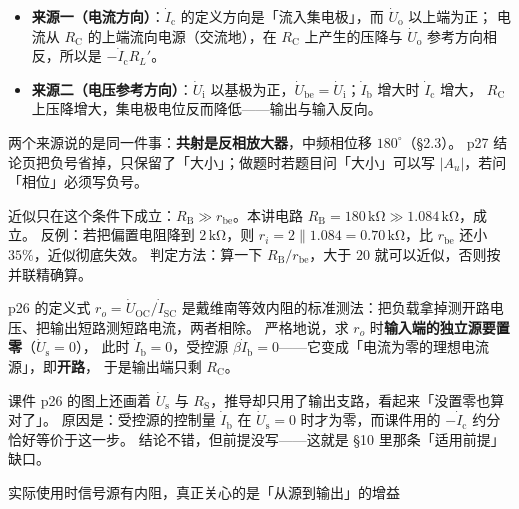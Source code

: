 \documentclass[11pt]{ctexart}
\begin{document}
\begin{itemize}
\item \textbf{来源一（电流方向）}：$\dot{I}_{\mathrm{c}}$ 的定义方向是「流入集电极」，而 $\dot{U}_{\mathrm{o}}$ 以上端为正；
电流从 $R_{\mathrm{C}}$ 的上端流向电源（交流地），在 $R_{\mathrm{C}}$ 上产生的压降与 $\dot{U}_{\mathrm{o}}$ 参考方向相反，所以是 $-\dot{I}_{\mathrm{c}}R_L'$。
\item \textbf{来源二（电压参考方向）}：$\dot{U}_{\mathrm{i}}$ 以基极为正，$\dot{U}_{\mathrm{be}}=\dot{U}_{\mathrm{i}}$；$\dot{I}_{\mathrm{b}}$ 增大时 $\dot{I}_{\mathrm{c}}$ 增大，
$R_{\mathrm{C}}$ 上压降增大，集电极电位反而降低——输出与输入反向。
\end{itemize}

两个来源说的是同一件事：\textbf{共射是反相放大器}，中频相位移 $180^\circ$（§2.3）。
p27 结论页把负号省掉，只保留了「大小」；做题时若题目问「大小」可以写 $|A_u|$，若问「相位」必须写负号。


近似只在这个条件下成立：$R_{\mathrm{B}}\gg r_{\mathrm{be}}$。本讲电路 $R_{\mathrm{B}}=180\,\mathrm{k\Omega}\gg1.084\,\mathrm{k\Omega}$，成立。
反例：若把偏置电阻降到 $2\,\mathrm{k\Omega}$，则 $r_i=2\parallel1.084=0.70\,\mathrm{k\Omega}$，比 $r_{\mathrm{be}}$ 还小 $35\%$，近似彻底失效。
判定方法：算一下 $R_{\mathrm{B}}/r_{\mathrm{be}}$，大于 $20$ 就可以近似，否则按并联精确算。


p26 的定义式 $r_o=\dot{U}_{\mathrm{OC}}/\dot{I}_{\mathrm{SC}}$ 是戴维南等效内阻的标准测法：把负载拿掉测开路电压、把输出短路测短路电流，两者相除。
严格地说，求 $r_o$ 时\textbf{输入端的独立源要置零}（$\dot{U}_{\mathrm{s}}=0$），
此时 $\dot{I}_{\mathrm{b}}=0$，受控源 $\beta\dot{I}_{\mathrm{b}}=0$——它变成「电流为零的理想电流源」，即\textbf{开路}，
于是输出端只剩 $R_{\mathrm{C}}$。

课件 p26 的图上还画着 $\dot{U}_{\mathrm{s}}$ 与 $R_{\mathrm{S}}$，推导却只用了输出支路，看起来「没置零也算对了」。
原因是：受控源的控制量 $\dot{I}_{\mathrm{b}}$ 在 $\dot{U}_{\mathrm{s}}=0$ 时才为零，而课件用的 $-\dot{I}_{\mathrm{c}}$ 约分恰好等价于这一步。
结论不错，但前提没写——这就是 §10 里那条「适用前提」缺口。


实际使用时信号源有内阻，真正关心的是「从源到输出」的增益
\end{document}
